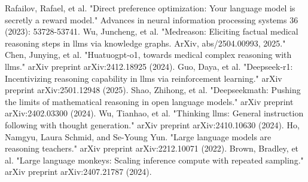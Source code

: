 \documentclass[conference]{IEEEtran}
\begin{document}
\begin{thebibliography}{00}
             Rafailov, Rafael, et al. "Direct preference optimization: Your language model is secretly a reward model." Advances in neural information processing systems 36 (2023): 53728-53741.
             Wu, Juncheng, et al. "Medreason: Eliciting factual medical reasoning steps in llms via knowledge graphs. ArXiv, abs/2504.00993, 2025."
             Chen, Junying, et al. "Huatuogpt-o1, towards medical complex reasoning with llms." arXiv preprint arXiv:2412.18925 (2024).
             Guo, Daya, et al. "Deepseek-r1: Incentivizing reasoning capability in llms via reinforcement learning." arXiv preprint arXiv:2501.12948 (2025).
             Shao, Zhihong, et al. "Deepseekmath: Pushing the limits of mathematical reasoning in open language models." arXiv preprint arXiv:2402.03300 (2024).
             Wu, Tianhao, et al. "Thinking llms: General instruction following with thought generation." arXiv preprint arXiv:2410.10630 (2024).
             Ho, Namgyu, Laura Schmid, and Se-Young Yun. "Large language models are reasoning teachers." arXiv preprint arXiv:2212.10071 (2022).
             Brown, Bradley, et al. "Large language monkeys: Scaling inference compute with repeated sampling." arXiv preprint arXiv:2407.21787 (2024).
            
         
	\end{thebibliography}
	
	
\end{document}

